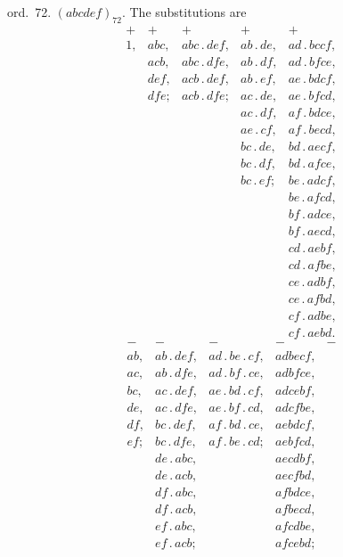 \documentclass[11pt]{article}
\begin{document}
\smallskip
\hspace{1em} ord.\ 72. $(abcdef)_{72}$. The substitutions are
\[
\begin{array}{lllll}
+ & + & + & + & +\\
1, & abc, & abc\,.\,def, & ab\,.\,de, & ad\,.\,bccf,\\
   & acb, & abc\,.\,dfe, & ab\,.\,df, & ad\,.\,bfce,\\
   & def, & acb\,.\,def, & ab\,.\,ef, & ae\,.\,bdcf,\\
   & dfe; & acb\,.\,dfe; & ac\,.\,de, & ae\,.\,bfcd,\\
   &      &              & ac\,.\,df, & af\,.\,bdce,\\
   &      &              & ae\,.\,cf, & af\,.\,becd,\\
   &      &              & bc\,.\,de, & bd\,.\,aecf,\\
   &      &              & bc\,.\,df, & bd\,.\,afce,\\
   &      &              & bc\,.\,ef; & be\,.\,adcf,\\
   &      &              &            & be\,.\,afcd,\\
   &      &              &            & bf\,.\,adce,\\
   &      &              &            & bf\,.\,aecd,\\
   &      &              &            & cd\,.\,aebf,\\
   &      &              &            & cd\,.\,afbe,\\
   &      &              &            & ce\,.\,adbf,\\
   &      &              &            & ce\,.\,afbd,\\
   &      &              &            & cf\,.\,adbe,\\
   &      &              &            & cf\,.\,aebd.
\end{array}
\]
\[
\begin{array}{lllll}
- & - & - & - & -\\
ab, & ab\,.\,def, & ad\,.\,be\,.\,cf, & adbecf,\\
ac, & ab\,.\,dfe, & ad\,.\,bf\,.\,ce, & adbfce,\\
bc, & ac\,.\,def, & ae\,.\,bd\,.\,cf, & adcebf,\\
de, & ac\,.\,dfe, & ae\,.\,bf\,.\,cd, & adcfbe,\\
df, & bc\,.\,def, & af\,.\,bd\,.\,ce, & aebdcf,\\
ef; & bc\,.\,dfe, & af\,.\,be\,.\,cd; & aebfcd,\\
    & de\,.\,abc, &                   & aecdbf,\\
    & de\,.\,acb, &                   & aecfbd,\\
    & df\,.\,abc, &                   & afbdce,\\
    & df\,.\,acb, &                   & afbecd,\\
    & ef\,.\,abc, &                   & afcdbe,\\
    & ef\,.\,acb; &                   & afcebd;
\end{array}
\]
\end{document}
